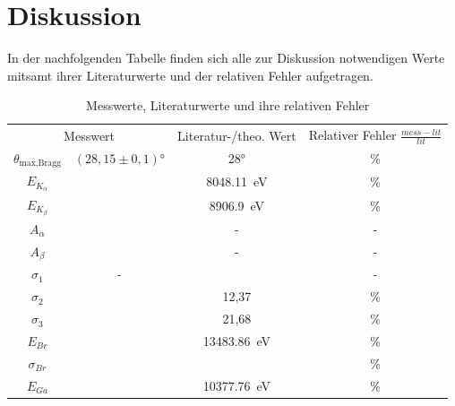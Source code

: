 
\section{Diskussion}

In der nachfolgenden Tabelle finden sich alle zur Diskussion notwendigen Werte
mitsamt ihrer Literaturwerte und der relativen Fehler aufgetragen.

\begin{table}[H]
\centering
\caption{Messwerte, Literaturwerte und ihre relativen Fehler}
\begin{tabular}{c c c c}
    \toprule
    \multicolumn{2}{c}{Messwert} &\multicolumn{1}{c}{Literatur-/theo. Wert}  &\multicolumn{1}{c}{Relativer Fehler $\frac{mess-lit}{lit} $}  \\
    \cmidrule(lr){1-4} 
       $\theta _{\text{max,Bragg}}$ & $(28,15\pm 0,1)°$  & 28° & \text{}\% \\
       $E_{K_{\alpha}} $ & \text{} & \SI{8048.11}{\electronvolt} \cite{NIST} & \text{}\% \\
       $E_{K_{\beta}}$ & \text{} & \SI{8906.9}{\electronvolt}\cite{NIST} & \text{}\%  \\
       $A_{\alpha} $ & \text{} & - & - \\
       $A_{\beta} $ & \text{} & - & - \\
       $\sigma _1 $ & - & \text{} & - \\
       $\sigma _2 $ & \text{} & 12,37 & \text{} \% \\
       $\sigma _3 $ & \text{} & 21,68 & \text{}\% \\
       $E_{Br} $ & \text{} & \SI{13483.86}{\electronvolt}\cite{NIST} & \text{}\%  \\
       $\sigma _{Br} $ & \text{} & \text{} & \text{}\% \\
       $E_{Ga}$ & \text{} & \SI{10377.76}{\electronvolt}\cite{NIST} & \text{}\% \\

\end{tabular}
\end{table}
